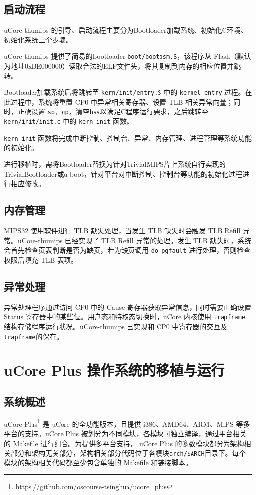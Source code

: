 \subsection{启动流程}
uCore-thumips 的引导、启动流程主要分为Bootloader加载系统、初始化C环境、初始化系统三个步骤。

uCore-thumips 提供了简易的Bootloader \texttt{boot/bootasm.S}，该程序从 Flash（默认为地址0xBE000000）读取合法的ELF文件头，将其复制到内存的相应位置并跳转。

Bootloader加载系统后将跳转至 \texttt{kern/init/entry.S} 中的 \texttt{kernel\_entry} 过程。在此过程中，系统将重置 CP0 中异常相关寄存器、设置 TLB 相关异常向量；同时，正确设置 \texttt{sp, gp}，清空\texttt{bss}以满足C程序运行要求，之后跳转至 \texttt{kern/init/init.c} 中的 \texttt{kern\_init} 函数。

\texttt{kern\_init} 函数将完成中断控制、控制台、异常、内存管理、进程管理等系统功能的初始化。

进行移植时，需将Bootloader替换为针对TrivialMIPS片上系统自行实现的TrivialBootloader或u-boot，针对平台对中断控制、控制台等功能的初始化过程进行相应修改。

\subsection{内存管理}

MIPS32 使用软件进行 TLB 缺失处理，当发生 TLB 缺失时会触发 TLB Refill 异常。uCore-thumips 已经实现了 TLB Refill 异常的处理。发生 TLB 缺失时，系统会首先检查页表判断是否为缺页，若为缺页调用 \texttt{do\_pgfault} 进行处理，否则检查权限后填充 TLB 表项。

\subsection{异常处理}
异常处理程序通过访问 CP0 中的 Cause 寄存器获取异常信息，同时需要正确设置 Status 寄存器中的某些位。用户态和特权态切换时，uCore 内核使用 \texttt{trapframe} 结构存储程序运行状况。uCore-thumips 已实现和 CP0 中寄存器的交互及\texttt{trapframe}的保存。

\section{uCore Plus 操作系统的移植与运行}
\subsection{系统概述}
uCore Plus\footnote{\url{https://github.com/oscourse-tsinghua/ucore_plus}} 是 uCore 的全功能版本，且提供 i386、AMD64、ARM、MIPS 等多平台的支持。uCore Plus 被划分为不同模块，各模块可独立编译，通过平台相关的 Makefile 进行组合。为提供多平台支持， uCore Plus 的多数模块都分为架构相关部分和架构无关部分，架构相关部分代码位于各模块\texttt{arch/\$ARCH}目录下。每个模块的架构相关代码都至少包含单独的 Makefile 和链接脚本。

